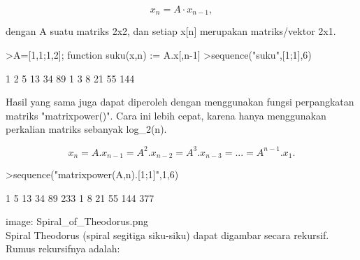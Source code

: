 \documentclass[a4paper,10pt]{article}
\begin{document}
\begin{eulernotebook}
\begin{eulercomment}
\begin{eulercomment}
\begin{eulercomment}
\begin{eulercomment}
\begin{eulercomment}
\end{eulercomment}
\begin{eulerformula}
\[
x_n =A \cdot x_{n-1},
\]
\end{eulerformula}
\begin{eulercomment}
dengan A suatu matriks 2x2, dan setiap x[n] merupakan matriks/vektor 2x1.
\end{eulercomment}
\begin{eulerprompt}
>A=[1,1;1,2]; function suku(x,n) := A.x[,n-1]
>sequence("suku",[1;1],6)
\end{eulerprompt}
\begin{euleroutput}
              1             2             5            13            34            89 
              1             3             8            21            55           144 
\end{euleroutput}
\begin{eulercomment}
Hasil yang sama juga dapat diperoleh dengan menggunakan fungsi perpangkatan matriks
"matrixpower()". Cara ini lebih cepat, karena hanya menggunakan perkalian matriks sebanyak
log\_2(n).

\end{eulercomment}
\begin{eulerformula}
\[
x_n=A.x_{n-1}=A^2.x_{n-2}=A^3.x_{n-3}= ... = A^{n-1}.x_1.
\]
\end{eulerformula}
\begin{eulerprompt}
>sequence("matrixpower(A,n).[1;1]",1,6)
\end{eulerprompt}
\begin{euleroutput}
              1             5            13            34            89           233 
              1             8            21            55           144           377 
\end{euleroutput}
\begin{eulercomment}
image: Spiral\_of\_Theodorus.png\\
Spiral Theodorus (spiral segitiga siku-siku) dapat digambar secara rekursif. Rumus
rekursifnya adalah:


\end{eulercomment}
\end{eulercomment}
\end{eulercomment}
\end{eulercomment}
\end{eulercomment}
\end{eulernotebook}
\end{document}

